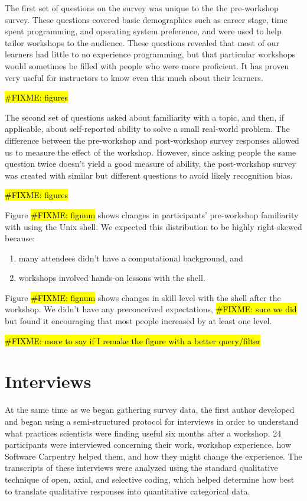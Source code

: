\documentclass[10pt,twocolumn,submission,copyright,creativecommons]{article}
\newcommand{\fixme}[1]{\hl{\#FIXME: #1}}
\begin{document}
The first set of questions on the survey was unique to the the pre-workshop survey.
These questions covered basic demographics such as career stage,
time spent programming,
and operating system preference,
and were used to help tailor workshops to the audience.
These questions revealed that most of our learners had little to no experience programming,
but that particular workshops would sometimes be filled with people who were more proficient.
It has proven very useful for instructors to know even this much about their learners.

\fixme{figures}

The second set of questions asked about familiarity with a topic,
and then,
if applicable,
about self-reported ability to solve a small real-world problem.
The difference between the pre-workshop and post-workshop survey responses allowed us to measure the effect of the workshop.
However, since asking people the same question twice doesn't yield a good measure of ability,
the post-workshop survey was created with similar but different questions to avoid likely recognition bias.

\fixme{figures}

Figure \fixme{fignum} shows changes in participants' pre-workshop familiarity with using the Unix shell.
We expected this distribution to be highly right-skewed because:

\begin{enumerate}
\item 
many attendees didn't have a computational background, and

\item 
workshops involved hands-on lessons with the shell.
\end{enumerate}

Figure \fixme{fignum} shows changes in skill level with the shell after the workshop.
We didn't have any preconceived expectations, \fixme{sure we did}
but found it encouraging that most people increased by at least one level.

\fixme{more to say if I remake the figure with a better query/filter}

\section{Interviews}

At the same time as we began gathering survey data,
the first author developed and began using a semi-structured protocol for interviews
in order to understand what practices scientists were finding useful six months after a workshop.
24 participants were interviewed concerning their work,
workshop experience,
how Software Carpentry helped them,
and how they might change the experience.
The transcripts of these interviews were analyzed
using the standard qualitative technique of open, axial, and selective coding,
which helped determine how best to translate qualitative responses into quantitative categorical data.
\end{document}

